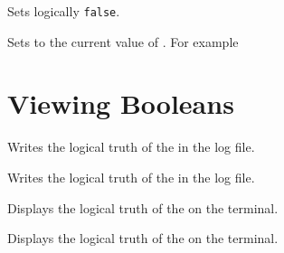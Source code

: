 \documentclass[oneside]{book}
\begin{document}
\begin{function}{\boolSetFalse}
\begin{syntax}
 
\end{syntax}
Sets  logically \texttt{false}.
\end{function}

\begin{function}{\boolSetEq}
\begin{syntax}
  
\end{syntax}
Sets  to the current value of .
For example
\begin{codehigh}
\boolSetTrue \lTmpaBool
\boolSetEq \lTmpbBool \lTmpaBool
\boolVarLog \lTmpbBool
\end{codehigh}
\end{function}

\section{Viewing Booleans}

\begin{function}{\boolLog}
\begin{syntax}
 
\end{syntax}
Writes the logical truth of the  in the log file.
\end{function}

\begin{function}{\boolVarLog}
\begin{syntax}
 
\end{syntax}
Writes the logical truth of the  in the log file.
\end{function}

\begin{function}{\boolShow}
\begin{syntax}
 
\end{syntax}
Displays the logical truth of the  on the terminal.
\end{function}

\begin{function}{\boolVarShow}
\begin{syntax}
 
\end{syntax}
Displays the logical truth of the  on the terminal.
\end{function}
\end{document}

